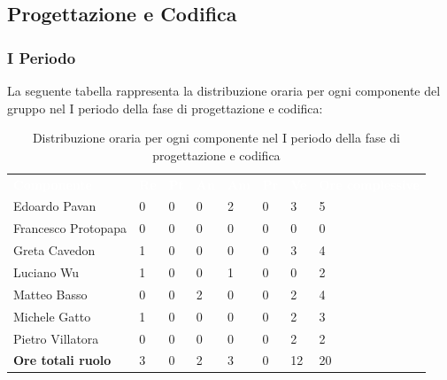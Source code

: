 \subsection{Progettazione e Codifica}
\subsubsection{I Periodo}
La seguente tabella rappresenta la distribuzione oraria per ogni componente del gruppo nel I periodo della fase di progettazione e codifica:
\begin{table}[!htbp]
\begin{center}
\renewcommand{\arraystretch}{1.25}
\begin{tabular}{ m{}<{\centering}  m{}<{\centering} m{}<{\centering} m{}<{\centering}  m{}<{\centering}  m{}<{\centering}  m{}<{\centering}  m{}<{\centering}   }
	\rowcolor{darkblue}
	\textcolor{white}{\textbf{Componente}} &\textcolor{white}{\textbf{Re}}&\textcolor{white}{\textbf{Pt}}&\textcolor{white}{\textbf{An}}&\textcolor{white}{\textbf{Am}}&\textcolor{white}{\textbf{Pr}}&\textcolor{white}{\textbf{Ve}}&\textcolor{white}{\textbf{Ore complessive}}\\ 
	Edoardo Pavan & 0 & 0 & 0 & 2 & 0 & 3 & 5 \\	
	
	Francesco Protopapa & 0 & 0 & 0 & 0 & 0 & 0 & 0 \\

	Greta Cavedon & 1 & 0 & 0 & 0 & 0 & 3 & 4 \\
	
	Luciano Wu & 1 & 0 & 0 & 1 & 0 & 0 & 2 \\
	
	Matteo Basso & 0 & 0 & 2 & 0 & 0 & 2 & 4 \\
	
	Michele Gatto & 1 & 0 & 0 & 0 & 0 & 2 & 3 \\
	
	Pietro Villatora & 0 & 0 & 0 & 0 & 0 & 2 & 2 \\
	
	\textbf{Ore totali ruolo} & 3 & 0 & 2 & 3 & 0 & 12 & 20 \\

\end{tabular}
\caption{Distribuzione oraria per ogni componente nel I periodo della fase di progettazione e codifica}
\end{center}
\end{table}

